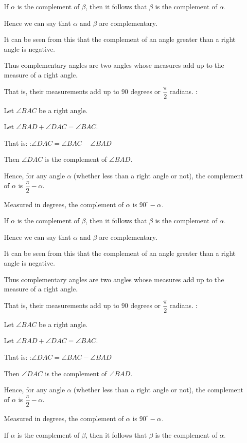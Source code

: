 If $\alpha$ is the complement of $\beta$, then it follows that $\beta$ is the complement of $\alpha$.

Hence we can say that $\alpha$ and $\beta$ are complementary.


It can be seen from this that the complement of an angle greater than a right angle is negative.


Thus complementary angles are two angles whose measures add up to the measure of a right angle.

That is, their measurements add up to $90$ degrees or $\dfrac \pi 2$ radians.
:

Let $\angle BAC$ be a right angle.

Let $\angle BAD + \angle DAC = \angle BAC$.

That is:
:$\angle DAC = \angle BAC - \angle BAD$


Then $\angle DAC$ is the complement of $\angle BAD$.


Hence, for any angle $\alpha$ (whether less than a right angle or not), the complement of $\alpha$ is $\dfrac \pi 2 - \alpha$.

Measured in degrees, the complement of $\alpha$ is $90^\circ - \alpha$.


If $\alpha$ is the complement of $\beta$, then it follows that $\beta$ is the complement of $\alpha$.

Hence we can say that $\alpha$ and $\beta$ are complementary.


It can be seen from this that the complement of an angle greater than a right angle is negative.


Thus complementary angles are two angles whose measures add up to the measure of a right angle.

That is, their measurements add up to $90$ degrees or $\dfrac \pi 2$ radians.
:

Let $\angle BAC$ be a right angle.

Let $\angle BAD + \angle DAC = \angle BAC$.

That is:
:$\angle DAC = \angle BAC - \angle BAD$


Then $\angle DAC$ is the complement of $\angle BAD$.


Hence, for any angle $\alpha$ (whether less than a right angle or not), the complement of $\alpha$ is $\dfrac \pi 2 - \alpha$.

Measured in degrees, the complement of $\alpha$ is $90^\circ - \alpha$.


If $\alpha$ is the complement of $\beta$, then it follows that $\beta$ is the complement of $\alpha$.

